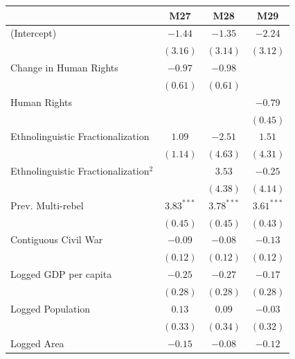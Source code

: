 \documentclass[12pt,]{book}
\let\origtable\table
\let\endorigtable\endtable
\renewenvironment{table}[1][2] {
    \singlespacing
    \expandafter\origtable\expandafter[H]
} {
    \endorigtable
}
\theoremstyle{definition}
\theoremstyle{definition}
\theoremstyle{definition}
\theoremstyle{remark}
\begin{document}
\begin{table}
\begin{center}
\begin{tabular}{l c c c }
\hline
 & M27 & M28 & M29 \\
\hline
(Intercept)                             & $-1.44$      & $-1.35$      & $-2.24$      \\
                                        & $(3.16)$     & $(3.14)$     & $(3.12)$     \\
Change in Human Rights                  & $-0.97$      & $-0.98$      &              \\
                                        & $(0.61)$     & $(0.61)$     &              \\
Human Rights                            &              &              & $-0.79$      \\
                                        &              &              & $(0.45)$     \\
Ethnolinguistic Fractionalization       & $1.09$       & $-2.51$      & $1.51$       \\
                                        & $(1.14)$     & $(4.63)$     & $(4.31)$     \\
Ethnolinguistic Fractionalization$^{2}$ &              & $3.53$       & $-0.25$      \\
                                        &              & $(4.38)$     & $(4.14)$     \\
Prev. Multi-rebel                       & $3.83^{***}$ & $3.78^{***}$ & $3.61^{***}$ \\
                                        & $(0.45)$     & $(0.45)$     & $(0.43)$     \\
Contiguous Civil War                    & $-0.09$      & $-0.08$      & $-0.13$      \\
                                        & $(0.12)$     & $(0.12)$     & $(0.12)$     \\
Logged GDP per capita                   & $-0.25$      & $-0.27$      & $-0.17$      \\
                                        & $(0.28)$     & $(0.28)$     & $(0.28)$     \\
Logged Population                       & $0.13$       & $0.09$       & $-0.03$      \\
                                        & $(0.33)$     & $(0.34)$     & $(0.32)$     \\
Logged Area                             & $-0.15$      & $-0.08$      & $-0.12$      \\

\end{tabular}
\end{center}
\end{table}
\end{document}
